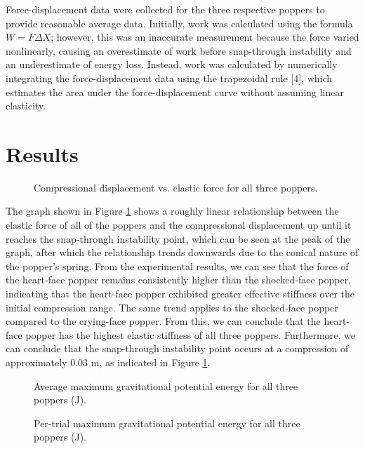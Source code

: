 \documentclass[12pt]{article}
\begin{document}
Force-displacement data were collected for the three respective poppers to provide reasonable average data. Initially, work was calculated using the formula $W = F \Delta X$; however, this was an inaccurate measurement because the force varied nonlinearly, causing an overestimate of work before snap-through instability and an underestimate of energy loss. Instead, work was calculated by numerically integrating the force-displacement data using the trapezoidal rule [4], which estimates the area under the force-displacement curve without assuming linear elasticity. 

\section{Results}

\begin{figure}[H]
    \centering
    
    \caption{Compressional displacement vs. elastic force for all three poppers.}
    \label{fig:1}
\end{figure}

The graph shown in Figure \ref{fig:1} shows a roughly linear relationship between the elastic force of all of the poppers and the compressional displacement up until it reaches the snap-through instability point, which can be seen at the peak of the graph, after which the relationship trends downwards due to the conical nature of the popper’s spring. From the experimental results, we can see that the force of the heart-face popper remains consistently higher than the shocked-face popper, indicating that the heart-face popper exhibited greater effective stiffness over the initial compression range. The same trend applies to the shocked-face popper compared to the crying-face popper. From this, we can conclude that the heart-face popper has the highest elastic stiffness of all three poppers. Furthermore, we can conclude that the snap-through instability point occurs at a compression of approximately $0.03\text{ m}$, as indicated in Figure \ref{fig:1}.

\begin{figure}[H]
    \centering
    
    \caption{Average maximum gravitational potential energy for all three poppers (J).}
    \label{fig:2.1}
\end{figure}

\begin{figure}[H]
    \centering
    
    \caption{Per-trial maximum gravitational potential energy for all three poppers (J).}
    \label{fig:2.2}
\end{figure}
\end{document}

